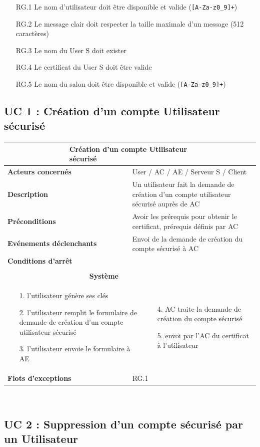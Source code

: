 \documentclass[a4paper,11pt,french]{article}
\newcommand{\fiche}[9] {
	\noindent
\begin{tabular}{|p{3.5cm}| p{1cm} | p{3cm} | p{.5cm} | p{7cm}|} 
\hline
\rowcolor{blue}
\multicolumn{2}{|l|}{\color{white}\bfseries{Nom}} & \multicolumn{3}{l|}{\color{white}\bfseries{#1}}\\
\hline
\multicolumn{2}{|l|}{\bfseries{Acteurs concernés}} & \multicolumn{3}{m{10.5cm}|}{#2}\\
\hline
\multicolumn{2}{|l|}{\bfseries{Description}} & \multicolumn{3}{m{10.5cm}|}{#3}\\
\hline
\multicolumn{2}{|l|}{\bfseries{Préconditions}} & \multicolumn{3}{m{10.5cm}|}{#4}\\
\hline
\multicolumn{2}{|l|}{\bfseries{Evénements déclenchants}} & \multicolumn{3}{m{10.5cm}|}{#5}\\
\hline
\multicolumn{2}{|l|}{\bfseries{Conditions d'arrêt}} & \multicolumn{3}{m{10.5cm}|}{#6}\\
\hline
\rowcolor{gray}
\multicolumn{5}{|c|}{\bfseries{Description du flot d'événements principal}}\\
\hline
\rowcolor{gray}
\multicolumn{3}{|c|}{\bfseries{Acteur(s)}} & \multicolumn{2}{c|}{\bfseries{Système}}\\
\hline
\multicolumn{3}{|p{7.5cm}|}{#7} & \multicolumn{2}{p{7.5cm}|}{#8}\\
\hline
\multicolumn{2}{|l}{\bfseries{Flots d'exceptions}} & \multicolumn{3}{|p{11.5cm}|}{#9}\\
\hline
\end{tabular}
\\
}
\begin{document}
\newpage
\begin{itemize}
\item [RG.1] Le nom d'utilisateur doit être disponible et valide (\verb![A-Za-z0_9]+!)
\item [RG.2] Le message clair doit respecter la taille maximale d'un message (512 caractères)
\item [RG.3] Le nom du User S doit exister
\item [RG.4] Le certificat du User S doit être valide
\item [RG.5] Le nom du salon doit être disponible et valide (\verb![A-Za-z0_9]+!)
\end{itemize}
\subsection{UC 1 : Création d'un compte Utilisateur sécurisé}

\fiche
	{Création d'un compte Utilisateur sécurisé} %
	{User / AC / AE / Serveur S / Client} %
	{Un utilisateur fait la demande de création d’un compte utilisateur sécurisé auprès de AC} %
	{Avoir les prérequis pour obtenir le certificat, prérequis définis par AC} %
	{Envoi de la demande de création du compte sécurisé à AC} %
	{} %
	{\begin{itemize}  %
		\item [1.] l’utilisateur génère ses clés
		\item [2.] l’utilisateur remplit le formulaire de demande de création d’un compte utilisateur sécurisé 
		\item [3.] l’utilisateur envoie le formulaire à AE  
	 \end{itemize}
	} 
	{\begin{itemize}  %
		\item []
		\item []
		\item [4.] AC traite la demande de création du compte sécurisé
		\item [5.] envoi par l'AC du certificat à l'utilisateur
	\end{itemize}
	 }
	{RG.1} %

\subsection{UC 2 : Suppression d’un compte sécurisé par un Utilisateur}
\end{document}
